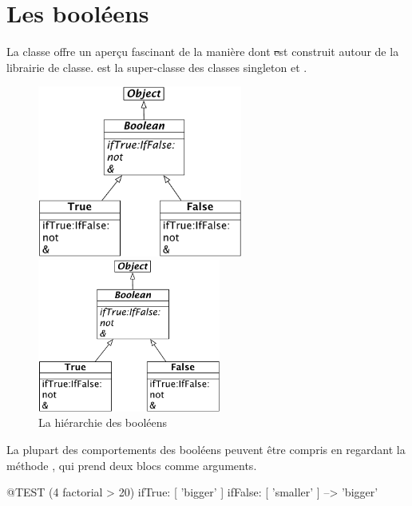 \documentclass[a4paper,10pt,twoside]{book}
\begin{document}

\section{Les booléens}

La classe  offre un aperçu fascinant de la manière dont \st est construit autour de la librairie de classe. 
 est la super-classe  des classes singleton   et .

\begin{figure}[ht]
\ifluluelse
	{\centerline {\includegraphics[width=0.6\textwidth]{BooleanHierarchy}}}
	{\centerline {\includegraphics[width=6cm]{BooleanHierarchy}}}
\caption{La hiérarchie des booléens \label{fig:booleans}}
\end{figure}

La plupart des comportements des booléens peuvent être compris en regardant la méthode , qui prend deux blocs comme arguments.

\begin{code}{@TEST}
(4 factorial > 20) ifTrue: [ 'bigger' ] ifFalse: [ 'smaller' ] --> 'bigger'
\end{code}
\end{document}
